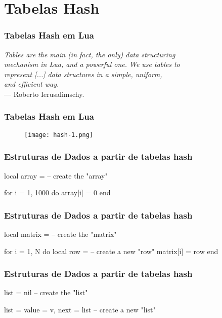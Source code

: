 \section{Tabelas Hash}
\begin{frame}
  \frametitle{Tabelas Hash em Lua}
  \begin{center}
    \textit{Tables are the main (in fact, the only) data structuring \\
              mechanism in Lua, and a powerful one. We use tables to \\
              represent [...] data structures in a simple, uniform, \\
              and efficient way.}\\
        --- Roberto Ierusalimschy.
    \end{center}
\end{frame}

\begin{frame}
  \frametitle{Tabelas Hash em Lua}
  \begin{figure}
    \centering
    \texttt{[image: hash-1.png]}
  \end{figure}
\end{frame}


\begin{frame}[fragile]
  \frametitle{Estruturas de Dados a partir de tabelas hash}

  \begin{code}
local array = {}  -- create the "array"

for i = 1, 1000 do
  array[i] = 0
end
  \end{code}
\end{frame}

\begin{frame}[fragile]
  \frametitle{Estruturas de Dados a partir de tabelas hash}
  \begin{code}
local matrix = {} -- create the "matrix"

for i = 1, N do
  local row = {}  -- create a new "row"
  matrix[i] = row
end
  \end{code}
\end{frame}

\begin{frame}[fragile]
  \frametitle{Estruturas de Dados a partir de tabelas hash}
  \begin{code}
list = nil -- create the "list"

list = {value = v, next = list} -- create a new "list"
  \end{code}
\end{frame}

